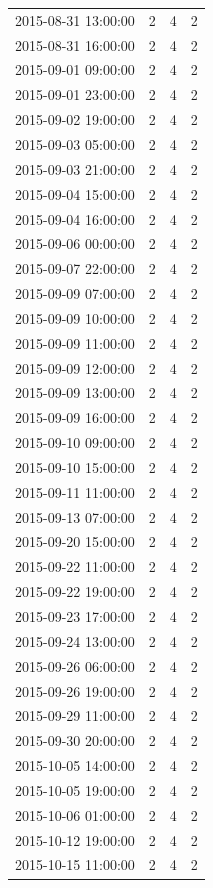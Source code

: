 \begin{tabular}{lrrr}
2015-08-31 13:00:00 & 2 & 4 & 2 \\
2015-08-31 16:00:00 & 2 & 4 & 2 \\
2015-09-01 09:00:00 & 2 & 4 & 2 \\
2015-09-01 23:00:00 & 2 & 4 & 2 \\
2015-09-02 19:00:00 & 2 & 4 & 2 \\
2015-09-03 05:00:00 & 2 & 4 & 2 \\
2015-09-03 21:00:00 & 2 & 4 & 2 \\
2015-09-04 15:00:00 & 2 & 4 & 2 \\
2015-09-04 16:00:00 & 2 & 4 & 2 \\
2015-09-06 00:00:00 & 2 & 4 & 2 \\
2015-09-07 22:00:00 & 2 & 4 & 2 \\
2015-09-09 07:00:00 & 2 & 4 & 2 \\
2015-09-09 10:00:00 & 2 & 4 & 2 \\
2015-09-09 11:00:00 & 2 & 4 & 2 \\
2015-09-09 12:00:00 & 2 & 4 & 2 \\
2015-09-09 13:00:00 & 2 & 4 & 2 \\
2015-09-09 16:00:00 & 2 & 4 & 2 \\
2015-09-10 09:00:00 & 2 & 4 & 2 \\
2015-09-10 15:00:00 & 2 & 4 & 2 \\
2015-09-11 11:00:00 & 2 & 4 & 2 \\
2015-09-13 07:00:00 & 2 & 4 & 2 \\
2015-09-20 15:00:00 & 2 & 4 & 2 \\
2015-09-22 11:00:00 & 2 & 4 & 2 \\
2015-09-22 19:00:00 & 2 & 4 & 2 \\
2015-09-23 17:00:00 & 2 & 4 & 2 \\
2015-09-24 13:00:00 & 2 & 4 & 2 \\
2015-09-26 06:00:00 & 2 & 4 & 2 \\
2015-09-26 19:00:00 & 2 & 4 & 2 \\
2015-09-29 11:00:00 & 2 & 4 & 2 \\
2015-09-30 20:00:00 & 2 & 4 & 2 \\
2015-10-05 14:00:00 & 2 & 4 & 2 \\
2015-10-05 19:00:00 & 2 & 4 & 2 \\
2015-10-06 01:00:00 & 2 & 4 & 2 \\
2015-10-12 19:00:00 & 2 & 4 & 2 \\
2015-10-15 11:00:00 & 2 & 4 & 2 \\

\end{tabular}
